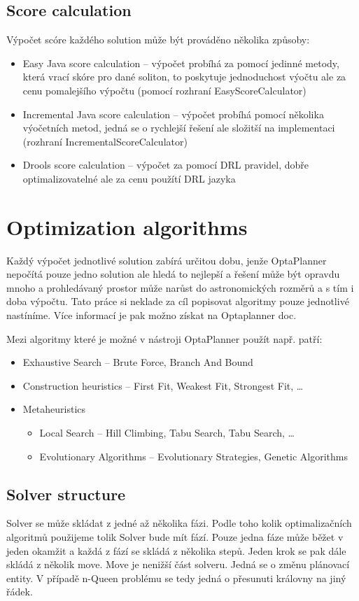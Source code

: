 \subsection{Score calculation}
Výpočet scóre každého solution může být prováděno několika způsoby: 
\begin{itemize}
\item Easy Java score calculation -- výpočet probíhá za pomocí jedinné metody, která vrací skóre pro dané soliton, to poskytuje jednoduchost výočtu ale za cenu pomalejšího výpočtu (pomocí rozhraní EasyScoreCalculator)
\item Incremental Java score calculation -- výpočet probíhá pomocí několika výočetních metod, jedná se o rychlejší řešení ale složitší na implementaci (rozhraní IncrementalScoreCalculator)
\item Drools score calculation -- výpočet za pomocí DRL pravidel, dobře optimalizovatelné ale za cenu použítí DRL jazyka
\end{itemize}

\section{Optimization algorithms}\label{optimalAlg}
Každý výpočet jednotlivé solution zabírá určitou dobu, jenže OptaPlanner nepočítá pouze jedno solution ale hledá to nejlepší a řešení může být opravdu mnoho a prohledávaný prostor může narůst do astronomických rozměrů a s tím i doba výpočtu. Tato práce si neklade za cíl popisovat algoritmy pouze jednotlivé nastíníme. Více informací je pak možno získat na Optaplanner doc.

Mezi algoritmy které je možné v nástroji OptaPlanner použít např. patří:
\begin{itemize}
\item Exhaustive Search -- Brute Force,  Branch And Bound
\item Construction heuristics --  First Fit, Weakest Fit,  Strongest Fit, \dots
\item Metaheuristics
\begin{itemize}
\item Local Search --  Hill Climbing, Tabu Search, Tabu Search, \dots
\item Evolutionary Algorithms -- Evolutionary Strategies, Genetic Algorithms
\end{itemize}
\end{itemize}

\subsection{Solver structure}
Solver se může skládat z jedné až několika fázi. Podle toho kolik optimalizačních algoritmů použijeme tolik Solver bude mít fází. Pouze jedna fáze může běžet v jeden okamžit a  každá z fází se skládá z několika stepů. Jeden krok se pak dále skládá z několik move. Move je nenižší část solveru. Jedná se o změnu plánovací entity. V případě n-Queen problému se tedy jedná o přesunuti královny na jiný řádek.  


